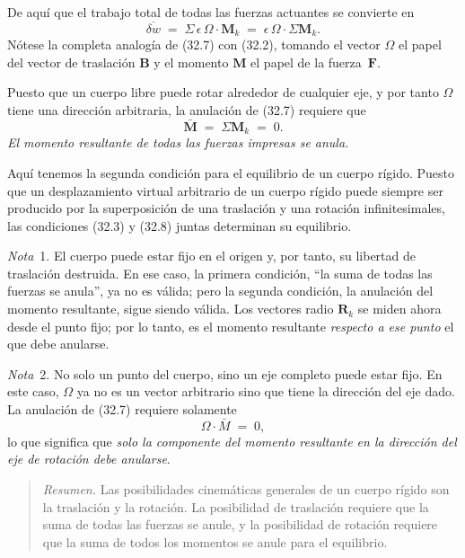 De aquí que el trabajo total de todas las fuerzas actuantes se convierte en
\begin{equation}
\overline{\delta w} \;=\; \Sigma\,\epsilon\,\Omega \cdot \mathbf{M}_k \;=\; \epsilon\,\Omega \cdot \Sigma\mathbf{M}_k. \tag{32.7}
\end{equation}
Nótese la completa analogía de (32.7) con (32.2), tomando el vector $\Omega$ el papel del vector de traslación $\mathbf{B}$ y el momento $\mathbf{M}$ el papel de la fuerza~$\mathbf{F}$.

Puesto que un cuerpo libre puede rotar alrededor de cualquier eje, y por tanto $\Omega$ tiene una dirección arbitraria, la anulación de (32.7) requiere que
\begin{equation}
\bar{\mathbf{M}} \;=\; \Sigma\mathbf{M}_k \;=\; 0. \tag{32.8}
\end{equation}
\emph{El momento resultante de todas las fuerzas impresas se anula.}

Aquí tenemos la segunda condición para el equilibrio de un cuerpo rígido. Puesto que un desplazamiento virtual arbitrario de un cuerpo rígido puede siempre ser producido por la superposición de una traslación y una rotación infinitesimales, las condiciones (32.3) y (32.8) juntas determinan su equilibrio.

\medskip
\noindent\textit{Nota}~1. El cuerpo puede estar fijo en el origen y, por tanto, su libertad de traslación destruida. En ese caso, la primera condición, ``la suma de todas las fuerzas se anula'', ya no es válida; pero la segunda condición, la anulación del momento resultante, sigue siendo válida. Los vectores radio $\mathbf{R}_k$ se miden ahora desde el punto fijo; por lo tanto, es el momento resultante \emph{respecto a ese punto} el que debe anularse.

\noindent\textit{Nota}~2. No solo un punto del cuerpo, sino un eje completo puede estar fijo. En este caso, $\Omega$ ya no es un vector arbitrario sino que tiene la dirección del eje dado. La anulación de (32.7) requiere solamente
\begin{equation}
\Omega \cdot \bar{M} \;=\; 0, \tag{32.9}
\end{equation}
lo que significa que \emph{solo la componente del momento resultante en la dirección del eje de rotación debe anularse}.

\begin{quote}
\textit{Resumen.} Las posibilidades cinemáticas generales de un cuerpo rígido son la traslación y la rotación. La posibilidad de traslación requiere que la suma de todas las fuerzas se anule, y la posibilidad de rotación requiere que la suma de todos los momentos se anule para el equilibrio.
\end{quote}

